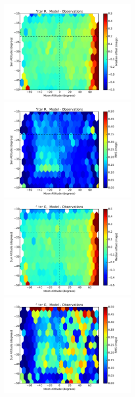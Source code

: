\documentclass[]{spie}
\begin{document}
\begin{figure}
  \includegraphics[height=5cm]{plots/zenithMedian_R_.pdf}\includegraphics[height=5cm]{plots/zenithRMS_R_.pdf}
  \includegraphics[height=5cm]{plots/zenithMedian_G_.pdf}\includegraphics[height=5cm]{plots/zenithRMS_G_.pdf}

\end{figure}
\end{document}
